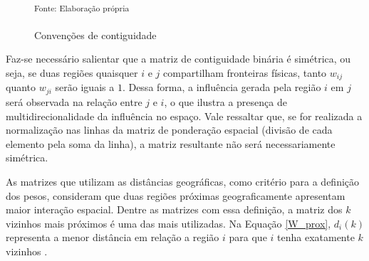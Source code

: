 \documentclass[12pt,a4paper]{article}
\begin{document}
\begin{figure}[H]
	\centering
	\caption{Convenções de contiguidade}\label{contiguidade_2}
	\small
	\hspace{0.3cm}
	\hspace{0.2cm}
	\\
    \parbox{\dimexpr\linewidth-8cm}{\raggedright
    \strut \textsuperscript{Fonte: Elaboração própria}\strut}
\end{figure}
	
	
Faz-se necessário salientar que a matriz de contiguidade binária é simétrica, ou seja, se duas regiões quaisquer $i$ e $j$ compartilham fronteiras físicas, tanto $w_{ij}$ quanto $w_{ji}$ serão iguais a $1$. Dessa forma, a influência gerada pela região $i$ em $j$ será observada na relação entre $j$ e $i$, o que ilustra a presença de multidirecionalidade da influência no espaço. Vale ressaltar que, se for realizada a normalização nas linhas da matriz de ponderação espacial (divisão de cada elemento pela soma da linha), a matriz resultante não será necessariamente simétrica.
	
As matrizes que utilizam as distâncias geográficas, como critério para a definição dos pesos, consideram que duas regiões próximas geograficamente apresentam maior interação espacial. Dentre as matrizes com essa definição, a matriz dos $k$ vizinhos mais próximos é uma das mais utilizadas. Na Equação \ref{W_prox}, $d_i(k)$ representa a menor distância em relação a região $i$ para que $i$ tenha exatamente $k$ vizinhos \cite{almeida12}.
	
\end{document}
